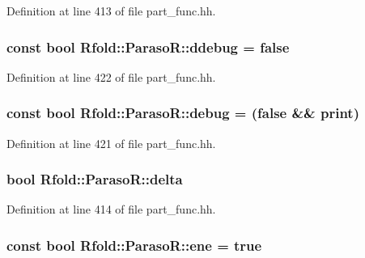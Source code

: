 Definition at line 413 of file part\+\_\+func.\+hh.

\hypertarget{class_rfold_1_1_paraso_r_ae9b7970e1a048776c3ae5ca788f7d760}{
\subsubsection[{ddebug}]{\setlength{\rightskip}{0pt plus 5cm}const bool Rfold\+::\+Paraso\+R\+::ddebug = false\hspace{0.3cm}{\ttfamily [static]}}}\label{class_rfold_1_1_paraso_r_ae9b7970e1a048776c3ae5ca788f7d760}


Definition at line 422 of file part\+\_\+func.\+hh.

\hypertarget{class_rfold_1_1_paraso_r_a2858329db34fcaaa334abbfcea96c01d}{
\subsubsection[{debug}]{\setlength{\rightskip}{0pt plus 5cm}const bool Rfold\+::\+Paraso\+R\+::debug = (false \&\& {\bf print})\hspace{0.3cm}{\ttfamily [static]}}}\label{class_rfold_1_1_paraso_r_a2858329db34fcaaa334abbfcea96c01d}


Definition at line 421 of file part\+\_\+func.\+hh.

\hypertarget{class_rfold_1_1_paraso_r_ac0a808250ee05c1f56b5be32d867f11e}{
\subsubsection[{delta}]{\setlength{\rightskip}{0pt plus 5cm}bool Rfold\+::\+Paraso\+R\+::delta}}\label{class_rfold_1_1_paraso_r_ac0a808250ee05c1f56b5be32d867f11e}


Definition at line 414 of file part\+\_\+func.\+hh.

\hypertarget{class_rfold_1_1_paraso_r_a6e98b41eab558c42df86f5ff7469e7cc}{
\subsubsection[{ene}]{\setlength{\rightskip}{0pt plus 5cm}const bool Rfold\+::\+Paraso\+R\+::ene = true\hspace{0.3cm}{\ttfamily [static]}}}\label{class_rfold_1_1_paraso_r_a6e98b41eab558c42df86f5ff7469e7cc}


